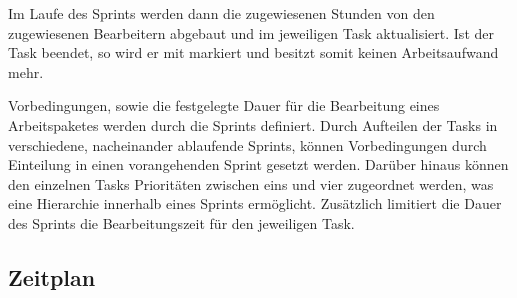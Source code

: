 Im Laufe des Sprints werden dann die zugewiesenen Stunden von den zugewiesenen Bearbeitern abgebaut und im jeweiligen Task aktualisiert.
Ist der Task beendet, so wird er mit  markiert und besitzt somit keinen Arbeitsaufwand mehr.

Vorbedingungen, sowie die festgelegte Dauer für die Bearbeitung eines Arbeitspaketes werden durch die Sprints definiert. 
Durch Aufteilen der Tasks in verschiedene, nacheinander ablaufende Sprints, können Vorbedingungen durch Einteilung in einen vorangehenden Sprint gesetzt werden.
Darüber hinaus können den einzelnen Tasks Prioritäten zwischen eins und vier zugeordnet werden, was eine Hierarchie innerhalb eines Sprints ermöglicht.
Zusätzlich limitiert die Dauer des Sprints die Bearbeitungszeit für den jeweiligen Task.

\subsection{Zeitplan}

